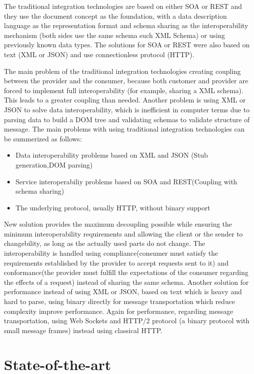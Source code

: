 \documentclass[runningheads,a4paper]{llncs}
\begin{document}
The traditional integration technologies are based on either SOA or REST and they use the document concept as the foundation, with a data description language as the representation format and schema sharing as the interoperability mechanism (both sides use the same schema such XML Schema) or using previously known data types. The solutions for SOA or REST were also based on text (XML or JSON) and use connectionless protocol (HTTP).

The main problem of the traditional integration technologies creating coupling between the provider and the consumer, because both customer and provider are forced to implement full interoperability (for example, sharing a XML schema). This leads to a greater coupling than needed. Another problem is using XML or JSON to solve data interoperability, which is inefficient in computer terms due to parsing data to build a DOM tree and validating schemas to validate structure of message.
The main problems with using traditional integration technologies can be summerized as follows:
\begin{itemize}
  \item Data interoperability problems based on XML and JSON (Stub generation,DOM parsing)
  \item Service interoperabiliy problems based on SOA and REST(Coupling with schema sharing)
  \item The underlying protocol, usually HTTP, without binary support
\end{itemize}

New solution provides the maximum decoupling possible while ensuring the minimum interoperability requirements and allowing the client or the sender to changebility, as long as the actually used parts do not change. The interoperability is handled using compliance(consumer must satisfy the requirements established by the provider to accept requests sent to it)\cite{compliance} and conformance(the provider must fulfill the expectations of the consumer regarding the effects of a request)\cite{comformance} instead of sharing the same schema. Another solution for performance instead of using XML or JSON, based on text which is heavy and hard to parse, using binary directly for message transportation which reduce complexity improve performance. Again for performance, regarding message transportation, using Web Sockets and HTTP/2 protocol (a binary protocol with small message frames) instead using classical HTTP.

\section{State-of-the-art}
\end{document}
